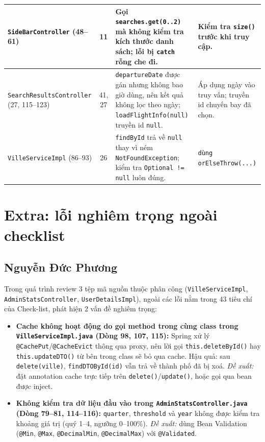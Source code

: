 \documentclass[12pt,a4paper]{article}
\begin{document}
{\begin{longtable}{|L{3.1cm}|c|L{6.3cm}|L{4.0cm}|}
\texttt{SideBar\-Controller} (48--61) & 11 & Gọi \texttt{searches.get(0..2)} mà không kiểm tra kích thước danh sách; lỗi bị \texttt{catch} rỗng che đi. & Kiểm tra \texttt{size()} trước khi truy cập. \\ \hline
\texttt{SearchResults\-Controller} (27, 115--123) & 41, 27 & \texttt{departureDate} được gán nhưng không bao giờ dùng, nên kết quả không lọc theo ngày; \texttt{loadFlightInfo(null)} truyền id \texttt{null}. & Áp dụng ngày vào truy vấn; truyền id chuyến bay đã chọn. \\ \hline
\texttt{VilleServiceImpl} (86--93) & 26 & \texttt{findById} trả về \texttt{null} thay vì ném \texttt{NotFoundException}; kiểm tra \texttt{Optional != null} luôn đúng. & \texttt{dùng orElseThrow(...)} \\ \hline
\end{longtable}
}

\section{Extra: lỗi nghiêm trọng ngoài checklist}

\subsection{Nguyễn Đức Phương}
Trong quá trình review 3 tệp mã nguồn thuộc phân công (\texttt{VilleServiceImpl}, \texttt{AdminStatsController}, \texttt{UserDetailsImpl}), ngoài các lỗi nằm trong 43 tiêu chí của Check-list, phát hiện 2 vấn đề nghiêm trọng:
\begin{itemize}
  \item \textbf{Cache không hoạt động do gọi method trong cùng class trong \texttt{VilleServiceImpl.java} (Dòng 98, 107, 115):} Spring xử lý \texttt{@CachePut}/\texttt{@CacheEvict} thông qua proxy, nên lời gọi \texttt{this.deleteById()} hay \texttt{this.updateDTO()} từ bên trong class sẽ bỏ qua cache. Hậu quả: sau \texttt{delete(ville)}, \texttt{findDTOById(id)} vẫn trả về thành phố đã bị xoá. \textit{Đề xuất:} đặt annotation cache trực tiếp trên \texttt{delete()}/\texttt{update()}, hoặc gọi qua bean được inject.
  \item \textbf{Không kiểm tra dữ liệu đầu vào trong \texttt{AdminStatsController.java} (Dòng 79--81, 114--116):} \texttt{quarter}, \texttt{threshold} và \texttt{year} không được kiểm tra khoảng giá trị (quý 1--4, ngưỡng 0--100\%). \textit{Đề xuất:} dùng Bean Validation (\texttt{@Min}, \texttt{@Max}, \texttt{@DecimalMin}, \texttt{@DecimalMax}) với \texttt{@Validated}.
\end{itemize}
\end{document}
